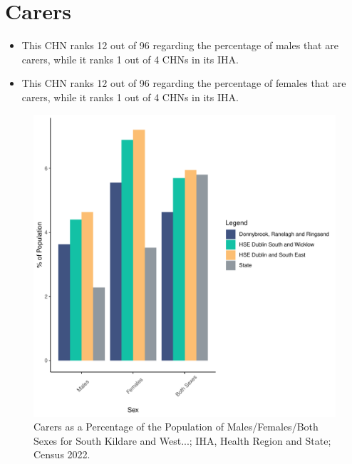\documentclass{article}
\begin{document}
\section{Carers}\label{sect:Carers}
\begin{itemize}
\item This CHN ranks  12 out of 96 regarding the percentage of males that are carers, while it ranks   1 out of 4 CHNs in its IHA.
\item This CHN ranks  12 out of 96 regarding the percentage of females that are carers, while it ranks   1 out of 4 CHNs in its IHA.
\end{itemize}
\begin{figure}[H]
	\centering
	\includegraphics[width = 150mm]{../figures/CareED.pdf}
	\caption{Carers as a Percentage of the Population of Males/Females/Both Sexes for South Kildare and West...; IHA, Health Region and State; Census 2022.}
	\label{fig:2ae19629-1a6a-13a3-e055-000000000001}
	\end{figure}
\end{document}
